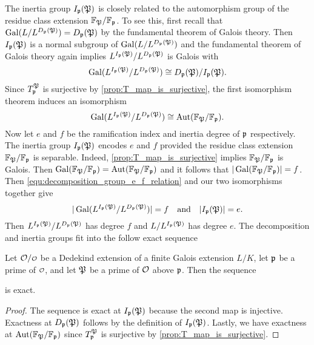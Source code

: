     The inertia group $I_{\mathfrak{p}}(\mathfrak{P})$ is closely related to the automorphism group of the residue class extension $\mathbb{F}_{\mathfrak{P}}/\mathbb{F}_{\mathfrak{p}}$. To see this, first recall that $\operatorname{\mathrm{Gal}}(L/L^{D_{\mathfrak{p}}(\mathfrak{P})}) = D_{\mathfrak{p}}(\mathfrak{P})$ by the fundamental theorem of Galois theory. Then $I_{\mathfrak{p}}(\mathfrak{P})$ is a normal subgroup of $\operatorname{\mathrm{Gal}}(L/L^{D_{\mathfrak{p}}(\mathfrak{P})})$ and the fundamental theorem of Galois theory again implies $L^{I_{\mathfrak{p}}(\mathfrak{P})}/L^{D_{\mathfrak{p}}(\mathfrak{P})}$ is Galois with
    \[
      \operatorname{\mathrm{Gal}}(L^{I_{\mathfrak{p}}(\mathfrak{P})}/L^{D_{\mathfrak{p}}(\mathfrak{P})}) \cong D_{\mathfrak{p}}(\mathfrak{P})/I_{\mathfrak{p}}(\mathfrak{P}).
    \]
    Since $T_{\mathfrak{p}}^{\mathfrak{P}}$ is surjective by \cref{prop:T_map_is_surjective}, the first isomorphism theorem induces an isomorphism
    \[
      \operatorname{\mathrm{Gal}}(L^{I_{\mathfrak{p}}(\mathfrak{P})}/L^{D_{\mathfrak{p}}(\mathfrak{P})}) \cong \operatorname{\mathrm{Aut}}(\mathbb{F}_{\mathfrak{P}}/\mathbb{F}_{\mathfrak{p}}).
    \]
    Now let $e$ and $f$ be the ramification index and inertia degree of $\mathfrak{p}$ respectively. The inertia group $I_{\mathfrak{p}}(\mathfrak{P})$ encodes $e$ and $f$ provided the residue class extension $\mathbb{F}_{\mathfrak{P}}/\mathbb{F}_{\mathfrak{p}}$ is separable. Indeed, \cref{prop:T_map_is_surjective} implies $\mathbb{F}_{\mathfrak{P}}/\mathbb{F}_{\mathfrak{p}}$ is Galois. Then $\operatorname{\mathrm{Gal}}(\mathbb{F}_{\mathfrak{P}}/\mathbb{F}_{\mathfrak{p}}) = \operatorname{\mathrm{Aut}}(\mathbb{F}_{\mathfrak{P}}/\mathbb{F}_{\mathfrak{p}})$ and it follows that $|\operatorname{\mathrm{Gal}}(\mathbb{F}_{\mathfrak{P}}/\mathbb{F}_{\mathfrak{p}})| = f$. Then \cref{equ:decomposition_group_e_f_relation} and our two isomorphisms together give
    \begin{equation}\label{equ:inertia_group_e_f_relation}
      |\operatorname{\mathrm{Gal}}(L^{I_{\mathfrak{p}}(\mathfrak{P})}/L^{D_{\mathfrak{p}}(\mathfrak{P})})| = f \quad \text{and} \quad |I_{\mathfrak{p}}(\mathfrak{P})| = e.
    \end{equation}
    Then $L^{I_{\mathfrak{p}}(\mathfrak{P})}/L^{D_{\mathfrak{p}}(\mathfrak{P})}$ has degree $f$ and $L/L^{I_{\mathfrak{p}}(\mathfrak{P})}$ has degree $e$. The decomposition and inertia groups fit into the follow exact sequence

    \begin{proposition}\label{prop:inertia_group_exact_sequence}
      Let $\mc{O}/\smc{O}$ be a Dedekind extension of a finite Galois extension $L/K$, let $\mathfrak{p}$ be a prime of $\smc{O}$, and let $\mathfrak{P}$ be a prime of $\mathcal{O}$ above $\mathfrak{p}$. Then the sequence

      \begin{center}
      \end{center}

      is exact.
    \end{proposition}
    \begin{proof}
      The sequence is exact at $I_{\mathfrak{p}}(\mathfrak{P})$ because the second map is injective. Exactness at $D_{\mathfrak{p}}(\mathfrak{P})$ follows by the definition of $I_{\mathfrak{p}}(\mathfrak{P})$. Lastly, we have exactness at $\operatorname{\mathrm{Aut}}(\mathbb{F}_{\mathfrak{P}}/\mathbb{F}_{\mathfrak{p}})$ since $T_{\mathfrak{p}}^{\mathfrak{P}}$ is surjective by \cref{prop:T_map_is_surjective}.
    \end{proof}

